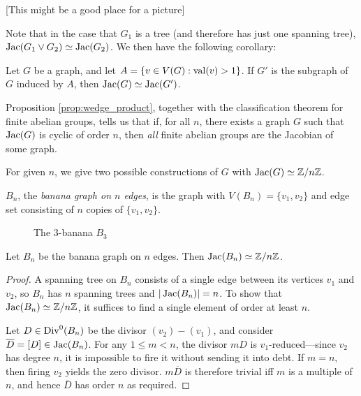 \documentclass{amsart}
\begin{document}
[This might be a good place for a picture]

Note that in the case that $G_1$ is a tree (and therefore has just one
spanning tree), $\operatorname{Jac}(G_1 \vee G_2) \simeq \operatorname{Jac}(G_2)$. We then have
the following corollary:
\begin{cor}
  \label{cor:1_valent}
  Let $G$ be a graph, and let $A = \{v \in V(G) : \operatorname{val}(v) > 1\}$. If
  $G'$ is the subgraph of $G$ induced by $A$, then $\operatorname{Jac}(G) \simeq
  \operatorname{Jac}(G')$.
\end{cor}

Proposition \ref{prop:wedge_product}, together with the classification
theorem for finite abelian groups, tells us that if, for all $n$,
there exists a graph $G$ such that $\operatorname{Jac}(G)$ is cyclic of order $n$,
then \emph{all} finite abelian groups are the Jacobian of some graph.

For given $n$, we give two possible constructions of $G$ with $\operatorname{Jac}(G)
\simeq \mathbb{Z}/n\mathbb{Z}$.

\begin{defn}
  $B_n$, the \emph{banana graph on $n$ edges}, is the graph with
  $V(B_n) = \{v_1, v_2\}$ and edge set consisting of $n$ copies of
  $\{v_1, v_2\}$.
\end{defn}

\begin{figure}[h]
  \begin{center}
    \caption{The $3$-banana $B_3$}
  \end{center}
\end{figure}

\begin{prop}
  \label{prop:banana_cyclic}
  Let $B_n$ be the banana graph on $n$ edges. Then $\operatorname{Jac}(B_n) \simeq \mathbb{Z}/n\mathbb{Z}$.
\end{prop}

\begin{proof}
  A spanning tree on $B_n$ consists of a single edge between its
  vertices $v_1$ and $v_2$, so $B_n$ has $n$ spanning trees and
  $|\operatorname{Jac}(B_n)| = n$. To show that $\operatorname{Jac}(B_n) \simeq \mathbb{Z}/n\mathbb{Z}$, it
  suffices to find a single element of order at least $n$.

  Let $D \in \operatorname{Div}^0(B_n)$ be the divisor $(v_2) - (v_1)$, and consider
  $\overline{D} = [D] \in \operatorname{Jac}(B_n)$. For any $1 \le m < n$, the
  divisor $mD$ is $v_1$-reduced---since $v_2$ has degree $n$, it is
  impossible to fire it without sending it into debt. If $m=n$, then
  firing $v_2$ yields the zero divisor. $m\overline{D}$ is therefore
  trivial iff $m$ is a multiple of $n$, and hence $\overline{D}$ has
  order $n$ as required.
\end{proof}
\end{document}
